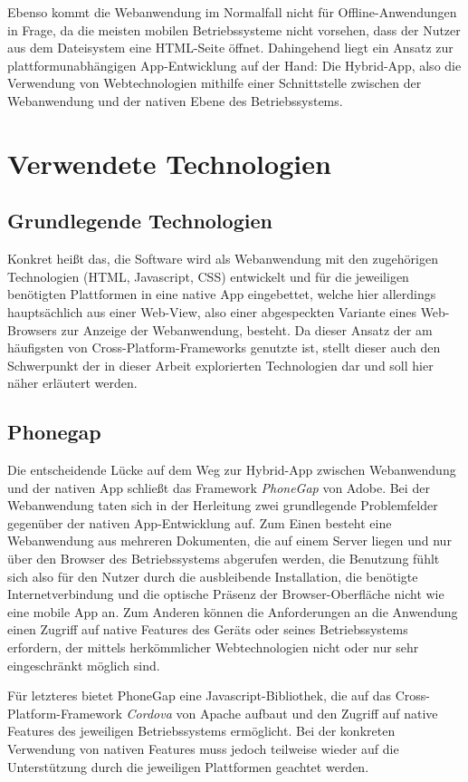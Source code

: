 \documentclass{scrreprt}
\begin{document}
Ebenso kommt die Webanwendung im Normalfall nicht für Offline-Anwendungen in Frage, da die meisten mobilen Betriebssysteme nicht vorsehen, dass der Nutzer aus dem Dateisystem eine HTML-Seite öffnet.  
Dahingehend liegt ein Ansatz zur plattformunabhängigen App-Entwicklung auf der Hand: Die Hybrid-App, also die Verwendung von Webtechnologien mithilfe einer Schnittstelle zwischen der Webanwendung und der nativen Ebene des Betriebssystems.

\section{Verwendete Technologien}
\subsection{Grundlegende Technologien}
Konkret heißt das, die Software wird als Webanwendung mit den zugehörigen Technologien (HTML, Javascript, CSS) entwickelt und für die jeweiligen benötigten Plattformen in eine native App eingebettet, welche hier allerdings hauptsächlich aus einer Web-View, also einer abgespeckten Variante eines Web-Browsers zur Anzeige der Webanwendung, besteht. Da dieser Ansatz der am häufigsten von Cross-Platform-Frameworks genutzte ist,  stellt dieser auch den Schwerpunkt der in dieser Arbeit explorierten Technologien dar und soll hier näher erläutert werden. 

\subsection{Phonegap}
Die entscheidende Lücke auf dem Weg zur Hybrid-App zwischen Webanwendung und der nativen App schließt das Framework \emph{PhoneGap} von Adobe. 
Bei der Webanwendung taten sich in der Herleitung zwei grundlegende Problemfelder gegenüber der nativen App-Entwicklung auf. 
Zum Einen besteht eine Webanwendung aus mehreren Dokumenten, die auf einem Server liegen und nur über den Browser des Betriebssystems abgerufen werden, die Benutzung fühlt sich also für den Nutzer durch die ausbleibende Installation, die benötigte Internetverbindung und die optische Präsenz der Browser-Oberfläche nicht wie eine mobile App an. 
Zum Anderen können die Anforderungen an die Anwendung einen Zugriff auf native Features des Geräts oder seines Betriebssystems erfordern, der mittels herkömmlicher Webtechnologien nicht oder nur sehr eingeschränkt möglich sind. 

Für letzteres bietet PhoneGap eine Javascript-Bibliothek, die auf das Cross-Platform-Framework \emph{Cordova} von Apache aufbaut und den Zugriff auf native Features des jeweiligen Betriebssystems ermöglicht.
Bei der konkreten Verwendung von nativen Features muss jedoch teilweise wieder auf die Unterstützung durch die jeweiligen Plattformen geachtet werden.
\end{document}
